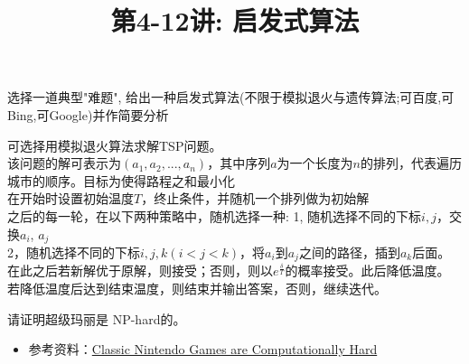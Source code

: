 \documentclass[a4paper, justified]{tufte-handout}
\title{第4-12讲: 启发式算法}
\date{\zhtoday} %
\begin{document}
\maketitle
\noplagiarism %
\begin{abstract}
\end{abstract}
\beginrequired

\begin{problem}[探索题]
选择一道典型"难题", 给出一种启发式算法(不限于模拟退火与遗传算法;可百度,可Bing,可Google)并作简要分析
\end{problem}

\begin{solution}
可选择用模拟退火算法求解TSP问题。\\
该问题的解可表示为$(a_1, a_2, ..., a_n)$，其中序列$a$为一个长度为$n$的排列，代表遍历城市的顺序。目标为使得路程之和最小化\\
在开始时设置初始温度$T$，终止条件，并随机一个排列做为初始解\\
之后的每一轮，在以下两种策略中，随机选择一种:
1,  随机选择不同的下标$i,j$，交换$a_i$, $a_j$\\
2，随机选择不同的下标$i,j,k(i < j <k)$，将$a_i$到$a_j$之间的路径，插到$a_k$后面。\\
在此之后若新解优于原解，则接受；否则，则以$e^{\frac{\delta}{T}}$的概率接受。此后降低温度。\\
若降低温度后达到结束温度，则结束并输出答案，否则，继续迭代。
\end{solution}



\beginoptional


\beginot
\begin{ot}
	请证明超级玛丽是 NP-hard的。	
	\begin{itemize}
	\item 参考资料：\href{http://cslabcms.nju.edu.cn/problem_solving/images/e/e0/Classic_Nintendo_Games_are_Computationally_Hard_\%28arXiv12_1203.1895\%29.pdf}{Classic Nintendo Games are Computationally Hard}
	\end{itemize}
\end{ot}
\end{document}
